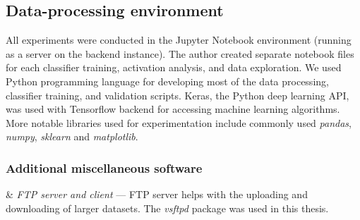 \subsection{Data-processing environment}

All experiments were conducted in the Jupyter Notebook environment (running as a server on the backend instance). The author created separate notebook files for each classifier training, activation analysis, and data exploration. We used Python programming language for developing most of the data processing, classifier training, and validation scripts. Keras, the Python deep learning API, was used with Tensorflow backend for accessing machine learning algorithms. More notable libraries used for experimentation include commonly used \textit{pandas}, \textit{numpy}, \textit{sklearn} and \textit{matplotlib}.

\subsubsection{Additional miscellaneous software}

\begin{easylist}[itemize]

& \textit{FTP server and client} --- FTP server helps with the uploading and downloading of larger datasets. The \textit{vsftpd} package was used in this thesis.

\end{easylist}

